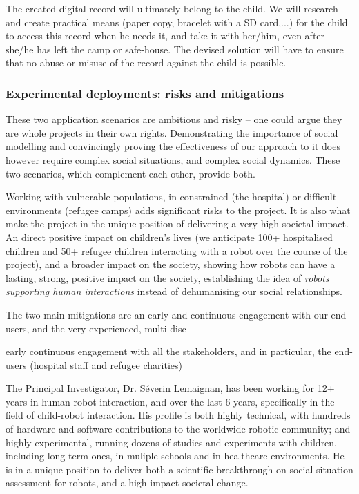 \documentclass[11pt]{article}
\begin{document}
The created digital record will ultimately belong to the child. We will research
and create practical means (paper copy, bracelet with a SD card,...) for the
child to access this record when he needs it, and take it with her/him, even
after she/he has left the camp or safe-house. The devised solution will have to
ensure that no abuse or misuse of the record against the child is possible.

\subsubsection{Experimental deployments: risks and mitigations}

These two application scenarios are ambitious and risky -- one could argue they
are whole projects in their own rights. Demonstrating the importance of social
modelling and convincingly proving the effectiveness of our approach to it does
however require complex social situations, and complex social dynamics. These
two scenarios, which complement each other, provide both.

Working with vulnerable populations, in constrained (the hospital) or difficult
environments (refugee camps) adds significant risks to the project. It is also
what make the project in the unique position of delivering a very high societal
impact. An direct positive impact on children's lives (we anticipate 100+
hospitalised children and 50+ refugee children interacting with a robot over the
course of the project), and a broader impact on the society, showing how robots
can have a lasting, strong, positive impact on the society, establishing the
idea of \emph{robots supporting human interactions} instead of dehumanising our
social relationships.

The two main mitigations are an early and continuous engagement with our
end-users, and the very experienced, multi-disc

early continuous engagement with all the
stakeholders, and in particular, the end-users (hospital staff and refugee
charities)

The Principal Investigator, Dr.
Séverin Lemaignan, has been working for 12+ years in human-robot interaction,
and over the last 6 years, specifically in the field of child-robot interaction.
His profile is both highly technical, with hundreds of hardware and software
contributions to the worldwide robotic community; and highly experimental,
running dozens of studies and experiments with children, including long-term
ones, in muliple schools and in healthcare environments. He is in a unique
position to deliver both a scientific breakthrough on social situation
assessment for robots, and a high-impact societal change.
\end{document}
